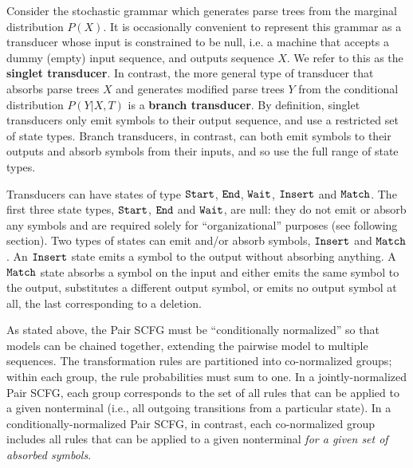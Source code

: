 \documentclass[10pt]{article}
\begin{document}
Consider the stochastic grammar which generates parse trees from the marginal distribution $P(X)$.
It is occasionally convenient to represent this grammar as a transducer whose input is constrained to be null,
i.e. a machine that accepts a dummy (empty) input sequence, and outputs sequence $X$.
We refer to this as the {\bf singlet transducer}.
In contrast, the more general type of transducer that absorbs parse trees $X$ and generates modified parse trees $Y$ from the conditional distribution $P(Y | X, T)$ is a {\bf branch transducer}.
By definition, singlet transducers only emit symbols to their output sequence, and use a restricted set of state types.
Branch transducers, in contrast, can both emit symbols to their outputs and absorb symbols from their inputs, and so use the full range of state types.

Transducers can have states of type $\mathtt{Start}$, $\mathtt{End}$,
$\mathtt{Wait}$, $\mathtt{Insert}$ and $\mathtt{Match}$.
The first three state types, $\mathtt{Start}$, $\mathtt{End}$ and $\mathtt{Wait}$, are null:
they do not emit or absorb any symbols and are required solely for
``organizational'' purposes (see following section).
Two types of states can emit and/or absorb symbols, $\mathtt{Insert}$ and $\mathtt{Match}$.
An $\mathtt{Insert}$ state emits a symbol to the output without absorbing anything.
A $\mathtt{Match}$ state absorbs a symbol on the input and either emits
the same symbol to the output, substitutes a different output symbol,
or emits no output symbol at all, the last corresponding to a deletion.

As stated above, the Pair SCFG must be ``conditionally normalized''
so that models can be chained together,
extending the pairwise model to multiple sequences.
The transformation rules are partitioned into co-normalized groups;
within each group, the rule probabilities must sum to one.
In a jointly-normalized Pair SCFG, each group corresponds to the set of all rules that can be applied to a given nonterminal
(i.e., all outgoing transitions from a particular state).
In a conditionally-normalized Pair SCFG, in contrast,
each co-normalized group includes all rules that can be applied to a
given nonterminal {\em for a given set of absorbed symbols}.

\end{document}
